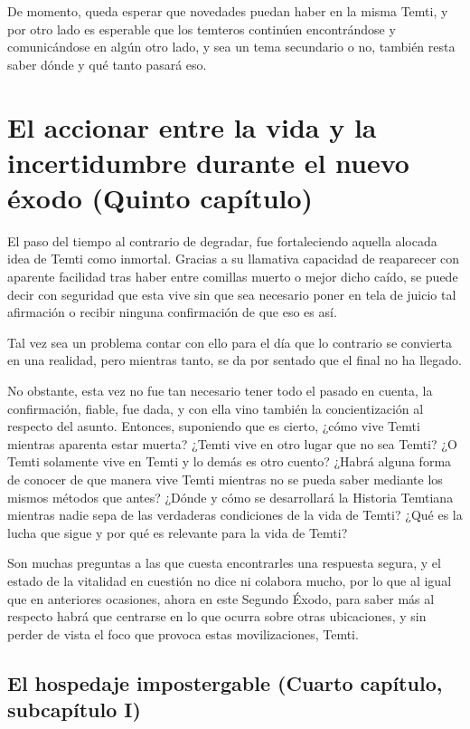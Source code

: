 \documentclass[
  spanish,
]{book}
\begin{document}
De momento, queda esperar que novedades puedan haber en la misma Temti, y por otro lado es esperable que los temteros continúen encontrándose y comunicándose en algún otro lado, y sea un tema secundario o no, también resta saber dónde y qué tanto pasará eso.

\hypertarget{el-accionar-entre-la-vida-y-la-incertidumbre-durante-el-nuevo-uxe9xodo-quinto-capuxedtulo}{%
\chapter{El accionar entre la vida y la incertidumbre durante el nuevo éxodo (Quinto capítulo)}\label{el-accionar-entre-la-vida-y-la-incertidumbre-durante-el-nuevo-uxe9xodo-quinto-capuxedtulo}}

El paso del tiempo al contrario de degradar, fue fortaleciendo aquella alocada idea de Temti como inmortal. Gracias a su llamativa capacidad de reaparecer con aparente facilidad tras haber entre comillas muerto o mejor dicho caído, se puede decir con seguridad que esta vive sin que sea necesario poner en tela de juicio tal afirmación o recibir ninguna confirmación de que eso es así.

Tal vez sea un problema contar con ello para el día que lo contrario se convierta en una realidad, pero mientras tanto, se da por sentado que el final no ha llegado.

No obstante, esta vez no fue tan necesario tener todo el pasado en cuenta, la confirmación, fiable, fue dada, y con ella vino también la concientización al respecto del asunto. Entonces, suponiendo que es cierto, ¿cómo vive Temti mientras aparenta estar muerta? ¿Temti vive en otro lugar que no sea Temti? ¿O Temti solamente vive en Temti y lo demás es otro cuento? ¿Habrá alguna forma de conocer de que manera vive Temti mientras no se pueda saber mediante los mismos métodos que antes? ¿Dónde y cómo se desarrollará la Historia Temtiana mientras nadie sepa de las verdaderas condiciones de la vida de Temti? ¿Qué es la lucha que sigue y por qué es relevante para la vida de Temti?

Son muchas preguntas a las que cuesta encontrarles una respuesta segura, y el estado de la vitalidad en cuestión no dice ni colabora mucho, por lo que al igual que en anteriores ocasiones, ahora en este Segundo Éxodo, para saber más al respecto habrá que centrarse en lo que ocurra sobre otras ubicaciones, y sin perder de vista el foco que provoca estas movilizaciones, Temti.

\hypertarget{el-hospedaje-impostergable-cuarto-capuxedtulo-subcapuxedtulo-i}{%
\section{El hospedaje impostergable (Cuarto capítulo, subcapítulo I)}\label{el-hospedaje-impostergable-cuarto-capuxedtulo-subcapuxedtulo-i}}
\end{document}
